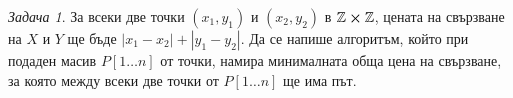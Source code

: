 \documentclass{article}
\theoremstyle{definition}
\theoremstyle{plain}
\theoremstyle{remark}
\newtheorem{problem}{Задача}
\theoremstyle{definition}
\begin{document}
\begin{problem}
За всеки две точки $(x_1, y_1)$ и $(x_2, y_2)$ в $\mathbb{Z} \cross \mathbb{Z}$, цената на свързване на $X$ и $Y$ ще бъде $|x_1 - x_2| + |y_1 - y_2|$.
Да се напише алгоритъм, който при подаден масив $P[1 \dots n]$ от точки, намира минималната обща цена на свързване, за която между всеки две точки от $P[1 \dots n]$ ще има път.
\end{problem}
\end{document}
